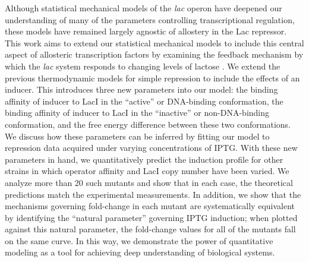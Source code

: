 Although statistical mechanical models of the \textit{lac} operon have deepened
our understanding of many of the parameters controlling transcriptional
regulation, these models have remained largely agnostic of allostery in the Lac
repressor. This work aims to extend our statistical mechanical models to include
this central aspect of allosteric transcription factors by examining the
feedback mechanism by which the \textit{lac} system responds to changing levels
of lactose \cite{JACOB1961}. We extend the previous thermodynamic models for
simple repression to include the effects of an inducer. This introduces three
new parameters into our model: the binding affinity of inducer to LacI in the
``active'' or DNA-binding conformation, the binding affinity of inducer to LacI
in the ``inactive'' or non-DNA-binding conformation, and the free energy
difference between these two conformations. We discuss how these parameters can
be inferred by fitting our model to repression data acquired under varying
concentrations of IPTG. With these new parameters in hand, we quantitatively
predict the induction profile for other strains in which operator affinity and
LacI copy number have been varied. We analyze more than 20 such mutants and show
that in each case, the theoretical predictions match the experimental
measurements. In addition, we show that the mechanisms governing fold-change in
each mutant are systematically equivalent by identifying the ``natural
parameter'' governing IPTG induction; when plotted against this natural
parameter, the fold-change values for all of the mutants fall on the same curve.
In this way, we demonstrate the power of quantitative modeling as a tool for
achieving deep understanding of biological systems.

